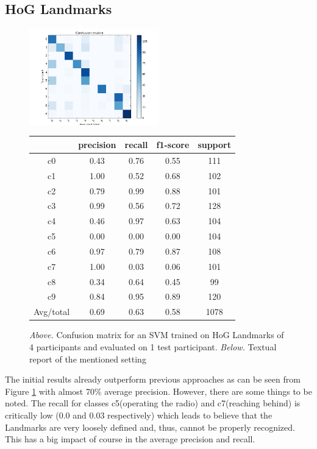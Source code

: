 \documentclass[10pt,twocolumn,letterpaper]{article}
\begin{document}
\subsection{HoG Landmarks}
\begin{figure}[h]
	\centering
	\includegraphics[width=0.5\textwidth]{mult_HOG/4c0123456789matComparable}
	\begin{tabular}{c||c|c|c|c}
		& precision&recall&f1-score&support\\	\hline
		c0&0.43&0.76&0.55&111\\
		c1&1.00&0.52&0.68&102\\
		c2&0.79&0.99&0.88&101\\
		c3&0.99&0.56&0.72&128\\
		c4&0.46&0.97&0.63&104\\
		c5&0.00&0.00&0.00&104\\
		c6&0.97&0.79&0.87&108\\
		c7&1.00&0.03&0.06&101\\
		c8&0.34&0.64&0.45&99\\
		c9&0.84&0.95&0.89&120\\ \hline
		Avg/total &0.69&0.63& 0.58 &1078
	\end{tabular}
	\caption{\textit{Above.} Confusion matrix for an SVM trained on HoG Landmarks of 4 participants and evaluated on 1 test participant. \textit{Below.} Textual report of the mentioned setting}
	\label{Landmarks_4all}
\end{figure}

The initial results already outperform previous approaches as can be seen from Figure \ref{Landmarks_4all}  with almost 70\% average precision. However, there are some things to be noted. The recall for classes c5(operating the radio) and c7(reaching behind) is critically low (0.0 and 0.03 respectively) which leads to believe that the Landmarks are very loosely defined and, thus, cannot be properly recognized. This has a big impact of course in the average precision and recall. 
\end{document}
